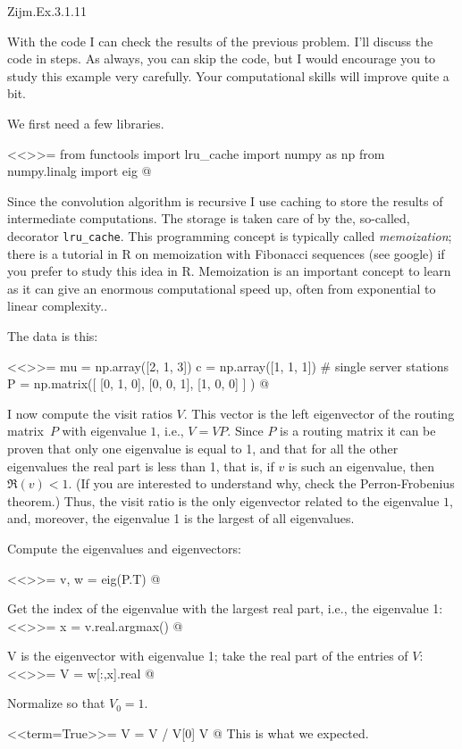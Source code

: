 \begin{question}
Zijm.Ex.3.1.11
\begin{solution}
  With the code I can check the results of the previous problem.  I'll
  discuss the code in steps. As always, you can skip the code, but I
  would encourage you to study this example very carefully. Your
  computational skills will improve quite a bit. 

We first need a few libraries. 

<<>>=
from functools import lru_cache
import numpy as np
from numpy.linalg import eig
@

Since the convolution algorithm is recursive I use caching to store
the results of intermediate computations. The storage is taken care of
by the, so-called, decorator \texttt{lru\_cache}. This programming
concept is typically called \emph{memoization}; there is a tutorial in
R on memoization with Fibonacci sequences (see google) if you prefer
to study this idea in R. Memoization is an important concept to learn
as it can give an enormous computational speed up, often from
exponential to linear complexity..

The data is this:

<<>>=
mu = np.array([2, 1, 3])
c = np.array([1, 1, 1]) # single server stations
P = np.matrix([
    [0, 1, 0],
    [0, 0, 1],
    [1, 0, 0]
]
)
@

I now compute the visit ratios $V$. This vector is the left
eigenvector of the routing matrix~$P$ with eigenvalue $1$, i.e.,
$V=VP$. Since $P$ is a routing matrix it can be proven that only one
eigenvalue is equal to 1, and that for all the other eigenvalues the
real part is less than 1, that is, if $v$ is such an eigenvalue, then
$\Re(v) < 1$. (If you are interested to understand why, check
the Perron-Frobenius theorem.) Thus, the visit ratio is the only
eigenvector related to the eigenvalue $1$, and, moreover, the
eigenvalue 1 is the largest of all eigenvalues.

Compute the eigenvalues and eigenvectors:

<<>>=
v, w = eig(P.T)
@ 

Get the index of the  eigenvalue with the largest real part, i.e., the  eigenvalue 1:
<<>>=
x = v.real.argmax() 
@

V is the eigenvector with eigenvalue 1; take the real part of the entries of $V$:
<<>>=
V = w[:,x].real 
@

Normalize so that $V_0 = 1$. 

<<term=True>>=
V = V / V[0] 
V
@
This is what we expected.


\end{solution}
\end{question}
